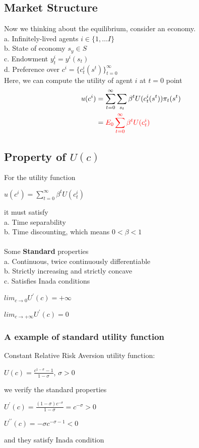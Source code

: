 \documentclass{article}
\begin{document}
\subsection{Market Structure}
Now we thinking about the equilibrium, consider an economy.\\
a. Infinitely-lived agents $i \in \{1, \ldots I\}$\\
b. State of economy $s_y \in S$\\
c. Endowment $y^i_t = y^i(s_t)$\\
d. Preference over $c^i = \{c^i_t(s^t)\}^\infty_{t=0}$\\
Here, we can compute the utility of agent $i$ at $t = 0$ point
\begin{align*}
	u(c^i) &= \sum^\infty_{t=0}\sum_{s_t} \beta^t U(c^i_t(s^t)) \pi_t(s^t)\\
	&= \color{red}{E_0 \sum^\infty_{t=0} \beta^t U(c^i_t)}
\end{align*}


\subsection{Property of $U(c)$}
For the utility function\\
\centerline{$u(c^i) = \sum^\infty_{t=0} \beta^t U(c^i_t)$}
it must satisfy\\
a. Time separability\\
b. Time discounting, which means $0 < \beta < 1$\\\\
Some \textbf{Standard} properties\\
a. Continuous, twice continuously differentiable\\
b. Strictly increasing and strictly concave\\
c. Satisfies Inada conditions\\
\centerline{$lim_{c \to 0} U^\prime (c) = +\infty$}
\centerline{$lim_{c \to +\infty} U^\prime (c) = 0$}

\subsubsection{A example of standard utility function}
Constant Relative Risk Aversion utility function:\\
\centerline{$U(c) = \frac{c^{1-\sigma} - 1}{1 - \sigma}$, $\sigma > 0$}
we verify the standard properties\\
\centerline{$U^\prime(c) = \frac{(1 - \sigma)c^{-\sigma}}{1 - \sigma} = c^{-\sigma} > 0$}
\centerline{$U^{\prime \prime}(c) = -\sigma c^{-\sigma-1} < 0$}
and they satisfy Inada condition
\end{document}
